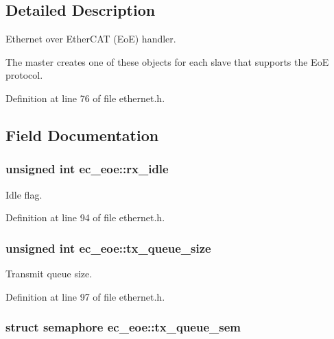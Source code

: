 \subsection{Detailed Description}
Ethernet over Ether\-C\-A\-T (Eo\-E) handler. 

The master creates one of these objects for each slave that supports the Eo\-E protocol. 

Definition at line 76 of file ethernet.\-h.



\subsection{Field Documentation}
\subsubsection[{rx\-\_\-idle}]{\setlength{\rightskip}{0pt plus 5cm}unsigned int ec\-\_\-eoe\-::rx\-\_\-idle}\label{structec__eoe_ad0775c67897e6c38beb0b656e8732d05}


Idle flag. 



Definition at line 94 of file ethernet.\-h.

\subsubsection[{tx\-\_\-queue\-\_\-size}]{\setlength{\rightskip}{0pt plus 5cm}unsigned int ec\-\_\-eoe\-::tx\-\_\-queue\-\_\-size}\label{structec__eoe_acaccde2a704283ace65f59aa1611e7cc}


Transmit queue size. 



Definition at line 97 of file ethernet.\-h.

\subsubsection[{tx\-\_\-queue\-\_\-sem}]{\setlength{\rightskip}{0pt plus 5cm}struct semaphore ec\-\_\-eoe\-::tx\-\_\-queue\-\_\-sem}\label{structec__eoe_a53d2194eaa281eeaf4d101443b4117a6}


